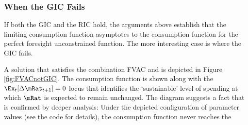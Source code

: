 \documentclass[titlepage]{\econtex}\providecommand{\texname}{BufferStockTheory}%
\begin{document}
\hypertarget{The-GIC}{}
\hypertarget{When-the-GIC-Fails}{}
\subsubsection{When the GIC Fails}

If both the GIC and the RIC hold, the arguments above establish that the limiting consumption
function asymptotes to the consumption function for the perfect foresight unconstrained function.
The more interesting case is where the GIC fails.
\begin{comment}
\WW{}{The same
steps as above lead to the same implication that this requires
$\InvEpShkInv < (\Rfree/\PGro)^{1/\CRRA}\uInvEpShkuInv^{1-1/\CRRA}$,
but when the RIC $\Rfree/\PGro > 1$ holds this condition is much more
easily satisfied.}
If the FVAC holds but the GIC does not, the parameters must satisfy:
\begin{eqnarray}
\DiscFac \PGro^{1-\CRRA}\Ex[\pshk^{1-\CRRA}] & < 1 < & (\Rfree\DiscFac)^{1/\CRRA}(\PGro\Ex[\pshk^{-1}])^{-1}. \label{eq:FVACnotGIC}
\end{eqnarray}

Note first that by Jensens's inequality $\Ex[\pshk^{1-\CRRA}] > 1$ and $(\Ex[\pshk^{-1}])^{-1} < 1$,
so \eqref{eq:FVACnotGIC} is stronger than
\begin{eqnarray}
\DiscFac \PGro^{1-\CRRA} & < 1 < & (\Rfree\DiscFac)^{1/\CRRA}/\PGro. \label{eq:PFFVACnotPFGIC}
\end{eqnarray}


Suppose $\PGro=1$, $\CRRA=2$ and $\pshk$ is lognormally distributed with $\sigma^{2}_{\pshk}=0.01$ (that is, $\log \pshk \sim \mathcal{N}(-\sigma_{\psi}^{2}/2,\sigma_{\psi}^{2})$) so that $\Ex_{t}[\pshk_{t+1}^{1-\CRRA}] =\Ex_{t}[\pshk_{t+1}^{-1}] =\exp(\sigma^{2}_{\psi})=e^{0.01}.$  Then the condition becomes
\begin{eqnarray}
\DiscFac e^{0.01} & < 1 < & (\Rfree \DiscFac)^{1/2}e^{-0.01}
\end{eqnarray}
which can be satisfied, for example, by $\DiscFac = 0.96$ and $\Rfree=1.08$.
\end{comment}
A solution that satisfies the combination FVAC and
 is depicted in Figure \ref{fig:FVACnotGIC}.  The
consumption function is shown along with the $\Ex_{t}[\Delta
\mRat_{t+1}]=0$ locus that identifies the `sustainable' level of
spending at which $\mRat$ is expected to remain unchanged.  The
diagram suggests a fact that is confirmed by deeper analysis: Under
the depicted configuration of parameter values (see the code for details), the consumption function never reaches the
\end{document}
